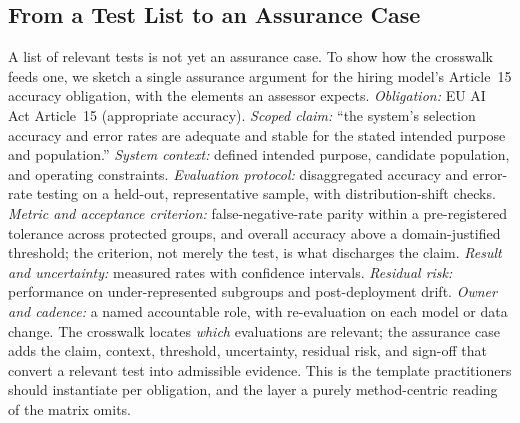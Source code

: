 \subsection{From a Test List to an Assurance Case}
A list of relevant tests is not yet an assurance case. To show how the crosswalk feeds one, we sketch a single assurance argument for the hiring model's Article~15 accuracy obligation, with the elements an assessor expects. \textit{Obligation:} EU AI Act Article~15 (appropriate accuracy). \textit{Scoped claim:} ``the system's selection accuracy and error rates are adequate and stable for the stated intended purpose and population.'' \textit{System context:} defined intended purpose, candidate population, and operating constraints. \textit{Evaluation protocol:} disaggregated accuracy and error-rate testing on a held-out, representative sample, with distribution-shift checks. \textit{Metric and acceptance criterion:} false-negative-rate parity within a pre-registered tolerance across protected groups, and overall accuracy above a domain-justified threshold; the criterion, not merely the test, is what discharges the claim. \textit{Result and uncertainty:} measured rates with confidence intervals. \textit{Residual risk:} performance on under-represented subgroups and post-deployment drift. \textit{Owner and cadence:} a named accountable role, with re-evaluation on each model or data change. The crosswalk locates \emph{which} evaluations are relevant; the assurance case adds the claim, context, threshold, uncertainty, residual risk, and sign-off that convert a relevant test into admissible evidence. This is the template practitioners should instantiate per obligation, and the layer a purely method-centric reading of the matrix omits.

